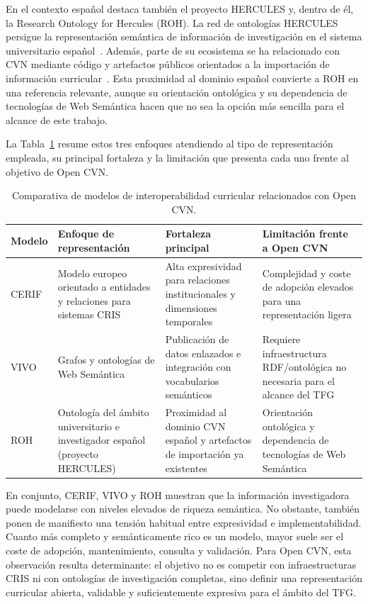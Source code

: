 En el contexto español destaca también el proyecto HERCULES y, dentro de él, la
Research Ontology for Hercules (ROH). La red de ontologías HERCULES persigue la
representación semántica de información de investigación en el sistema
universitario español~\cite{hercules_ontologias,roh_documentation}. Además, parte
de su ecosistema se ha relacionado con CVN mediante código y artefactos públicos
orientados a la importación de información curricular~\cite{roh_github,cvn_github}.
Esta proximidad al dominio español convierte a ROH en una referencia relevante,
aunque su orientación ontológica y su dependencia de tecnologías de Web Semántica
hacen que no sea la opción más sencilla para el alcance de este trabajo.

La Tabla~\ref{tab:estado_arte_modelos_interoperabilidad} resume estos tres
enfoques atendiendo al tipo de representación empleada, su principal fortaleza y
la limitación que presenta cada uno frente al objetivo de Open CVN.

\begin{table}[htbp]
  \centering
  \footnotesize
  \renewcommand{\arraystretch}{1.55}
  \caption{Comparativa de modelos de interoperabilidad curricular relacionados con Open CVN.}
  \label{tab:estado_arte_modelos_interoperabilidad}
  \begin{tabular}{p{} p{} p{} p{}}
    \hline
    \textbf{Modelo} & \textbf{Enfoque de representación} & \textbf{Fortaleza principal} & \textbf{Limitación frente a Open CVN} \\
    \hline
    CERIF & Modelo europeo orientado a entidades y relaciones para sistemas CRIS & Alta expresividad para relaciones institucionales y dimensiones temporales & Complejidad y coste de adopción elevados para una representación ligera \\
    VIVO & Grafos y ontologías de Web Semántica & Publicación de datos enlazados e integración con vocabularios semánticos & Requiere infraestructura RDF/ontológica no necesaria para el alcance del TFG \\
    ROH & Ontología del ámbito universitario e investigador español (proyecto HERCULES) & Proximidad al dominio CVN español y artefactos de importación ya existentes & Orientación ontológica y dependencia de tecnologías de Web Semántica \\
    \hline
  \end{tabular}
\end{table}

En conjunto, CERIF, VIVO y ROH muestran que la información investigadora puede
modelarse con niveles elevados de riqueza semántica. No obstante, también ponen
de manifiesto una tensión habitual entre expresividad e implementabilidad. Cuanto
más completo y semánticamente rico es un modelo, mayor suele ser el coste de
adopción, mantenimiento, consulta y validación. Para Open CVN, esta observación
resulta determinante: el objetivo no es competir con infraestructuras CRIS ni con
ontologías de investigación completas, sino definir una representación curricular
abierta, validable y suficientemente expresiva para el ámbito del TFG.

